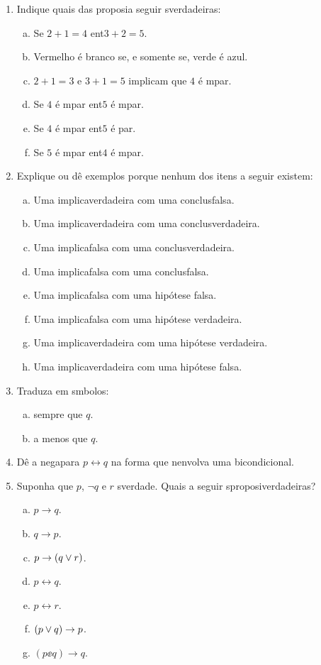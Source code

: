 \begin{enumerate}[{\bf 1.}]
\item Indique quais das proposi\coes a seguir s\ao verdadeiras:
\begin{enumerate}[a)]
\item Se $2+1=4$ ent\ao $3+2=5$.
\item Vermelho \'e branco se, e somente se, verde \'e azul.
\item $2+1=3$ e $3+1=5$ implicam que $4$ \'e \ih mpar.
\item Se $4$ \'e \ih mpar ent\ao $5$ \'e \ih mpar.
\item Se $4$ \'e \ih mpar ent\ao $5$ \'e par.
\item Se $5$ \'e \ih mpar ent\ao $4$ \'e \ih mpar. 
\end{enumerate}

\item Explique ou d\^e exemplos porque nenhum dos itens a seguir existem:
\begin{enumerate}[a)]
\item Uma implica\cao verdadeira com uma conclus\ao falsa.
\item Uma implica\cao verdadeira com uma conclus\ao verdadeira.
\item Uma implica\cao falsa com uma conclus\ao verdadeira.
\item Uma implica\cao falsa com uma conclus\ao falsa.
\item Uma implica\cao falsa com uma hip\'otese falsa.
\item Uma implica\cao falsa com uma hip\'otese verdadeira.
\item Uma implica\cao verdadeira com uma hip\'otese verdadeira.
\item Uma implica\cao verdadeira com uma hip\'otese falsa. 
\end{enumerate}

\item Traduza em s\ih mbolos:
\begin{enumerate}[a)]
\item \pp sempre que $q$.
\item \pp a menos que $q$.
\end{enumerate}

\item D\^e a nega\cao para $p \leftrightarrow q$ na forma que n\ao envolva uma bicondicional.

\item Suponha que $p$, $\lnot q$ e $r$ s\ao verdade. Quais a seguir s\ao proposi\coes verdadeiras?
\begin{multicols}{2}
\begin{enumerate}[a)]
\item $p \to q$.
\item $q \to p$.
\item $p \to (q \vee r)$.
\item $p \leftrightarrow q$.
\item $p \leftrightarrow r$.
\item $(p \vee q) \to p$.
\item $(p \ee q) \to q$.
\end{enumerate}
\end{multicols}


\end{enumerate}
